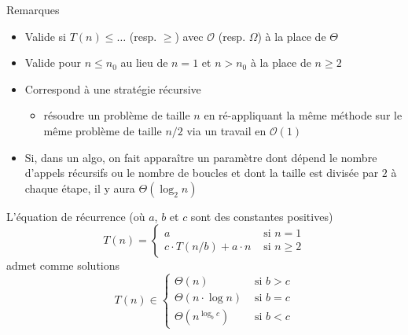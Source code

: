 \documentclass[aspectratio=1610,francais,envcountsect]{beamer}
\begin{document}
\begin{frame}[allowframebreaks]
  \begin{exampleblock}{Remarques}
    \begin{itemize}
    \item Valide si $T(n) \leq \ldots$ (resp. $\geq$) avec
      $\mathcal{O}$ (resp. $\Omega$) à la place de $\Theta$
    \item Valide pour $n \leq n_0$ au lieu de $n = 1$ et $n > n_0$ à
      la place de $n \geq 2$
    \item Correspond à une stratégie récursive
      \begin{itemize}
      \item résoudre un problème de taille $n$ en ré-appliquant la
        même méthode sur le même problème de taille $n/2$ via un
        travail en $\mathcal{O}(1)$
      \end{itemize}
    \item Si, dans un algo, on fait apparaître un paramètre dont
      dépend le nombre d’appels récursifs ou le nombre de boucles et
      dont la taille est divisée par $2$ à chaque étape, il y aura
      $\Theta(\log_2n)$
    \end{itemize}
  \end{exampleblock}

  \framebreak

  \begin{theorem}
    \label{thm:rec2}
    L’équation de récurrence (où $a$, $b$ et $c$ sont des constantes
    positives)
    \begin{equation}
      \label{eq:6}
      T(n) = 
      \begin{cases}
        a & \text{ si } n = 1\\
        c\cdot T(n/b) + a\cdot n & \text { si } n \geq 2
      \end{cases}
    \end{equation}
    admet comme solutions
    \begin{equation}
      T(n) \in
      \begin{cases}
        \Theta(n) & \text{ si } b > c\\
        \Theta(n\cdot\log n) & \text{ si } b=c\\
        \Theta(n^{\log_bc}) & \text{ si } b < c
      \end{cases}
      \label{eq:7}
    \end{equation}

  \end{theorem}


\end{frame}
\end{document}
